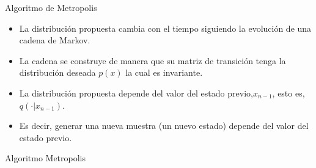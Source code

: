 \documentclass[11pt]{beamer}
\begin{document}
\begin{frame}{Algoritmo de Metropolis \citep{THEODORIDIS20201}}

\begin{itemize}
	\item La distribución propuesta cambia con el tiempo siguiendo la evolución de una cadena de Markov.
	\item La cadena se construye de manera que su matriz de transición tenga la distribución deseada $p(x)$ la cual es invariante. 
	\item La distribución propuesta depende del valor del estado previo,$x_{n-1}$, esto es, $q(\cdot|x_{n-1}) $.
	\item Es decir, generar una nueva muestra (un nuevo estado) depende del valor del estado previo.
\end{itemize}
\end{frame}


\begin{frame}\scriptsize

\begin{algorithm}[H]
	\LinesNumberedHidden
    \begin{algorithmic}
	\STATE{}
		\STATE{}
			
		\STATE{}
		\STATE{}
		\ELSE
		\ENDIF
	 \ENDFOR
	 	\STATE{}

	\end{algorithmic}
	
\caption{Algoritmo Metropolis \citep{THEODORIDIS20201}}
\end{algorithm}

\end{frame}
\end{document}
